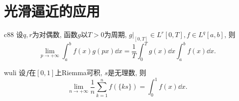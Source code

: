 \section{光滑逼近的应用}
\begin{theorem}{}{c88}
设\(q,r\)为对偶数, 函数\(g\)以\(T>0\)为周期, \(g\big|_{[0,T]}\in L^r[0,T], f\in L^q[a,b]\), 则\[\lim_{p\rightarrow+\infty}\int_{a}^{b}f(x)g(px)\dd x=\frac{1}{T}\int_{0}^{T}g(x)\dd x\int_{a}^{b}f(x)\dd x.\]
\end{theorem}
\begin{theorem}{}{wuli}
设\(f\)在\([0,1]\)上Riemma可积, \(s\)是无理数, 则\[\lim_{n\rightarrow+\infty}\frac{1}{n}\sum_{k=1}^{n}f\left(\{ks\}\right)=\int_{0}^{1}f(x)\dd x.\]
\end{theorem}
